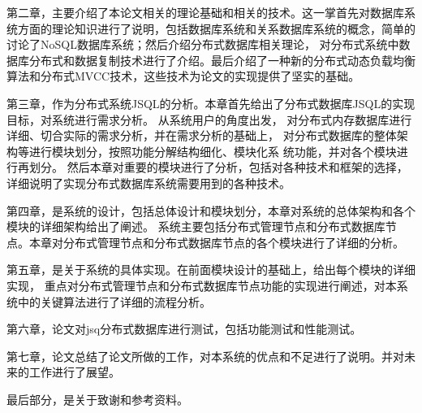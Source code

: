 第二章，主要介绍了本论文相关的理论基础和相关的技术。这一掌首先对数据库系统方面的理论知识进行了说明，包括数据库系统和关系数据库系统的概念，简单的讨论了NoSQL数据库系统；然后介绍分布式数据库相关理论，
对分布式系统中数据库分布式和数据复制技术进行了介绍。最后介绍了一种新的分布式动态负载均衡算法和分布式MVCC技术，这些技术为论文的实现提供了坚实的基础。

第三章，作为分布式系统JSQL的分析。本章首先给出了分布式数据库JSQL的实现目标，对系统进行需求分析。
从系统用户的角度出发，
对分布式内存数据库进行详细、切合实际的需求分析，并在需求分析的基础上，
对分布式数据库的整体架构等进行模块划分，按照功能分解结构细化、模块化系
统功能，并对各个模块进行再划分。
然后本章对重要的模块进行了分析，包括对各种技术和框架的选择，详细说明了实现分布式数据库系统需要用到的各种技术。

第四章，是系统的设计，包括总体设计和模块划分，本章对系统的总体架构和各个模块的详细架构给出了阐述。
系统主要包括分布式管理节点和分布式数据库节点。本章对分布式管理节点和分布式数据库节点的各个模块进行了详细的分析。

第五章，是关于系统的具体实现。在前面模块设计的基础上，给出每个模块的详细实现，
重点对分布式管理节点和分布式数据库节点功能的实现进行阐述，对本系统中的关键算法进行了详细的流程分析。

第六章，论文对jsq分布式数据库进行测试，包括功能测试和性能测试。

第七章，论文总结了论文所做的工作，对本系统的优点和不足进行了说明。并对未来的工作进行了展望。

最后部分，是关于致谢和参考资料。